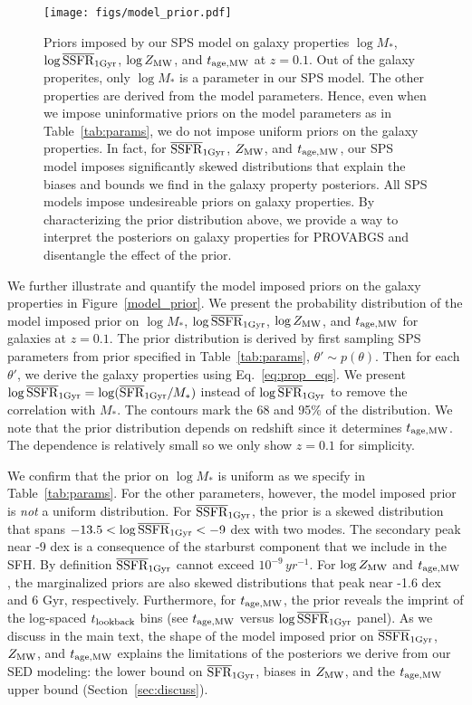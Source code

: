 \begin{figure}
\begin{center}
\texttt{[image: figs/model\_prior.pdf]}
    \caption{
    Priors imposed by our SPS model on galaxy properties $\log M_*$, $\log
    \overline{\rm SSFR}_{\rm 1 Gyr}$, $\log Z_{\rm MW}$, and $t_{\rm age, MW}$ at
    $z=0.1$. 
    Out of the galaxy properites, only $\log M_*$ is a parameter in our SPS
    model.
    The other properties are derived from the model parameters. 
    Hence, even when we impose uninformative priors on the model parameters as
    in Table~\ref{tab:params}, we do not impose uniform priors on the galaxy
    properties. 
    In fact, for $\overline{\rm SSFR}_{\rm 1Gyr}$, $Z_{\rm MW}$, and $t_{\rm age, MW}$, our SPS model imposes
    significantly skewed distributions that explain the biases and bounds we
    find in the galaxy property posteriors.  
    All SPS models impose undesireable priors on galaxy properties. 
    By characterizing the prior distribution above, we provide a way to
    interpret the posteriors on galaxy properties for PROVABGS and disentangle
    the effect of the prior. 
    }\label{fig:model_prior}
\end{center}
\end{figure}
We further illustrate and quantify the model imposed priors on the galaxy
properties in Figure~\ref{model_prior}. 
We present the probability distribution of the model imposed prior on 
$\log M_*$, $\log\overline{\rm SSFR}_{\rm 1Gyr}$, $\log Z_{\rm MW}$, and $t_{\rm age, MW}$ for galaxies at $z=0.1$.
The prior distribution is derived by first sampling SPS parameters from prior
specified in Table~\ref{tab:params}, $\theta'\sim p(\theta)$.
Then for each $\theta'$, we derive the galaxy properties using
Eq.~\ref{eq:prop_eqs}. 
We present $\log\overline{\rm SSFR}_{\rm 1Gyr} = \log(\overline{\rm SFR}_{\rm 1Gyr}/M_*)$ instead of $\log\overline{\rm SFR}_{\rm 1Gyr}$ to
remove the correlation with $M_*$.  
The contours mark the 68 and 95\% of the distribution. 
We note that the prior distribution depends on redshift since it determines
$t_{\rm age, MW}$.
The dependence is relatively small so we only show $z=0.1$ for simplicity. 

We confirm that the prior on $\log M_*$ is uniform as we specify in
Table~\ref{tab:params}. 
For the other parameters, however, the model imposed prior is \emph{not} a
uniform distribution. 
For $\overline{\rm SSFR}_{\rm 1Gyr}$, the prior is a skewed distribution that spans $-13.5 < \log
\overline{\rm SSFR}_{\rm 1Gyr} < -9$ dex with two modes.
The secondary peak near -9 dex is a consequence of the starburst component that
we include in the SFH. 
By definition $\overline{\rm SSFR}_{\rm 1Gyr}$ cannot exceed $10^{-9}\,yr^{-1}$. 
For $\log Z_{\rm MW}$ and $t_{\rm age, MW}$, the marginalized priors are also skewed
distributions that peak near -1.6 dex and 6 Gyr, respectively.
Furthermore, for $t_{\rm age, MW}$, the prior reveals the imprint of the log-spaced 
$t_{\rm lookback}$ bins (see $t_{\rm age, MW}$ versus $\log\overline{\rm SSFR}_{\rm 1Gyr}$ panel).
As we discuss in the main text, the shape of the model imposed prior on
$\overline{\rm SSFR}_{\rm 1Gyr}$, $Z_{\rm MW}$, and $t_{\rm age, MW}$ explains the limitations of the posteriors we
derive from our SED modeling: the lower bound on $\overline{\rm SFR}_{\rm 1Gyr}$, biases in $Z_{\rm MW}$,
and the $t_{\rm age, MW}$ upper bound (Section~\ref{sec:discuss}).


